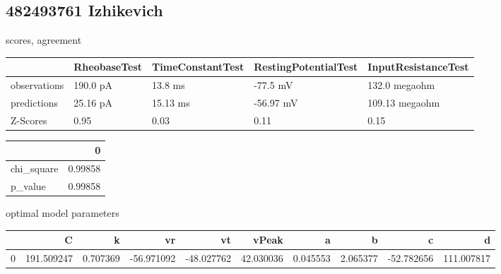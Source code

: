 \subsection{482493761 Izhikevich} scores, agreement\begin{tabular}{lllll}
\toprule
{} & RheobaseTest & TimeConstantTest & RestingPotentialTest & InputResistanceTest \\
\midrule
observations &     190.0 pA &          13.8 ms &             -77.5 mV &       132.0 megaohm \\
predictions  &     25.16 pA &         15.13 ms &            -56.97 mV &      109.13 megaohm \\
Z-Scores     &         0.95 &             0.03 &                 0.11 &                0.15 \\
\bottomrule
\end{tabular}
\begin{tabular}{lr}
\toprule
{} &        0 \\
\midrule
chi\_square &  0.99858 \\
p\_value    &  0.99858 \\
\bottomrule
\end{tabular}
optimal model parameters\begin{tabular}{lrrrrrrrrr}
\toprule
{} &           C &         k &         vr &         vt &      vPeak &         a &         b &          c &           d \\
\midrule
0 &  191.509247 &  0.707369 & -56.971092 & -48.027762 &  42.030036 &  0.045553 &  2.065377 & -52.782656 &  111.007817 \\
\bottomrule
\end{tabular}
